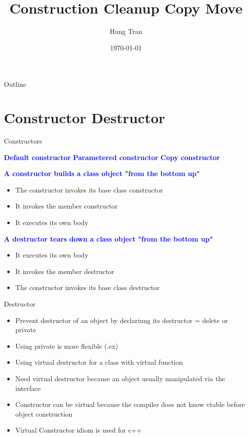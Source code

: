 \documentclass[13pt]{beamer}
\title[CPP]{Construction Cleanup Copy Move}
\author{Hung Tran}
\institute{Fpt software}
\date{\today}
\begin{document}
\begin{frame}
  \titlepage
\end{frame}

\begin{frame}{Outline}
  \tableofcontents
\end{frame}

\section{Constructor Destructor}

\begin{frame}{Constructors}
	\begin{center}
	\textcolor{blue}{\textbf{Default constructor}}
	\textcolor{blue}{\textbf{Parametered constructor}}
	\textcolor{blue}{\textbf{Copy constructor}}
	\end{center}

  \textcolor{blue}{\textbf{A constructor builds a class object "from the bottom up"}}
  \begin{itemize}
    \item The constructor invokes its base class constructor
    \item It invokes the member constructor
    \item It executes its own body
  \end{itemize}

  \textcolor{blue}{\textbf{A destructor tears down a class object "from the bottom up"}}
  \begin{itemize}
    \item It executes its own body
    \item It invokes the member destructor
    \item The constructor invokes its base class destructor
  \end{itemize}
\end{frame}

\begin{frame}{Destructor}
\begin{itemize}
    \item Prevent destructor of an object by declariung its destructor = delete or private
    \item Using private is more flexible (.ex)
    \item Using virtual destructor for a class with virtual function
    \item Need virtual destructor because an object usually manipulated via the interface
    \item Constructor can be virtual because the compiler does not know vtable before object construction
    \item Virtual Constructor idiom is used for c++
  \end{itemize}
\end{frame}
\end{document}
